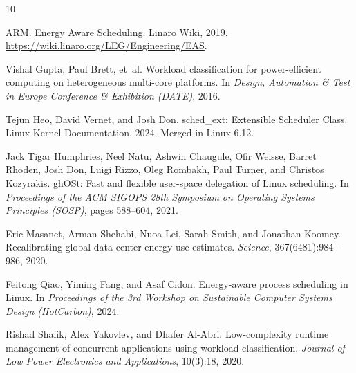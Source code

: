\documentclass{article}
\begin{document}

\begin{thebibliography}{10}

ARM.
\newblock Energy Aware Scheduling.
\newblock Linaro Wiki, 2019.
\newblock \url{https://wiki.linaro.org/LEG/Engineering/EAS}.

Vishal Gupta, Paul Brett, et~al.
\newblock Workload classification for power-efficient computing on heterogeneous multi-core platforms.
\newblock In \emph{Design, Automation \& Test in Europe Conference \& Exhibition (DATE)}, 2016.

Tejun Heo, David Vernet, and Josh Don.
\newblock sched\_ext: Extensible Scheduler Class.
\newblock Linux Kernel Documentation, 2024.
\newblock Merged in Linux 6.12.

Jack Tigar Humphries, Neel Natu, Ashwin Chaugule, Ofir Weisse, Barret Rhoden, Josh Don, Luigi Rizzo, Oleg Rombakh, Paul Turner, and Christos Kozyrakis.
\newblock ghOSt: Fast and flexible user-space delegation of {Linux} scheduling.
\newblock In \emph{Proceedings of the ACM SIGOPS 28th Symposium on Operating Systems Principles (SOSP)}, pages 588--604, 2021.

Eric Masanet, Arman Shehabi, Nuoa Lei, Sarah Smith, and Jonathan Koomey.
\newblock Recalibrating global data center energy-use estimates.
\newblock \emph{Science}, 367(6481):984--986, 2020.

Feitong Qiao, Yiming Fang, and Asaf Cidon.
\newblock Energy-aware process scheduling in {Linux}.
\newblock In \emph{Proceedings of the 3rd Workshop on Sustainable Computer Systems Design (HotCarbon)}, 2024.

Rishad Shafik, Alex Yakovlev, and Dhafer Al-Abri.
\newblock Low-complexity runtime management of concurrent applications using workload classification.
\newblock \emph{Journal of Low Power Electronics and Applications}, 10(3):18, 2020.

\end{thebibliography}

\newpage
\appendix
\end{document}
